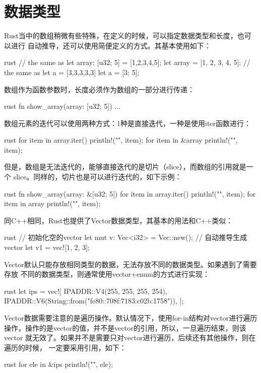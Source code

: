 \section{数据类型}
Rust当中的数组稍微有些特殊，在定义的时候，可以指定数据类型和长度，也可以进行
自动推导，还可以使用简便定义的方式。其基本使用如下：
\begin{code-block}{rust}
// the same as let array: [u32; 5] = [1,2,3,4,5];
let array = [1, 2, 3, 4, 5];
// the same as let a = [3,3,3,3,3]
let a = [3; 5];
\end{code-block}

数组作为函数参数时，长度必须作为数组的一部分进行传递：
\begin{code-block}{rust}
fn show_array(array: [u32; 5]) {
    ...
}
\end{code-block}

数组元素的迭代可以使用两种方式：1种是直接迭代，一种是使用iter函数进行：
\begin{code-block}{rust}
for item in array.iter() {
    println!("{}", item);
}
for item in &array {
    println!("{}", item);
}
\end{code-block}
但是，数组是无法迭代的，能够直接迭代的是切片（slice），而数组的引用就是一个
slice。同样的，切片也是可以进行迭代的，如下示例：
\begin{code-block}{rust}
fn show_array(array: &[u32; 5]) {
    for item in array.iter() {
        println!("{}", item);
    }
    for item in array {
        println!("{}", item);
    }
}
\end{code-block}

同C++相同，Rust也提供了Vector数据类型，其基本的用法和C++类似：
\begin{code-block}{rust}
// 初始化空的vector
let mut v: Vec<i32> = Vec::new();
// 自动推导生成vector
let v1 = vec![1, 2, 3];
\end{code-block}

Vector默认只能存放相同类型的数据，无法存放不同的数据类型。如果遇到了需要存放
不同的数据类型，则通常使用vector+enum的方式进行实现：
\begin{code-block}{rust}
let ips = vec![
    IPADDR::V4(255, 255, 255, 254),
    IPADDR::V6(String::from("fe80::708f:7183:c02b:1758")),
];
\end{code-block}

Vector数据需要注意的是遍历操作。默认情况下，使用for-in结构对vector进行遍历
操作，操作的是vector的值，并不是vector的引用，所以，一旦遍历结束，则该vector
就无效了。如果并不是需要只对vector进行遍历，后续还有其他操作，则在遍历的时候，
一定要采用引用，如下：
\begin{code-block}{rust}
for ele in &ips {
    println!("{}", ele);
}
\end{code-block}

